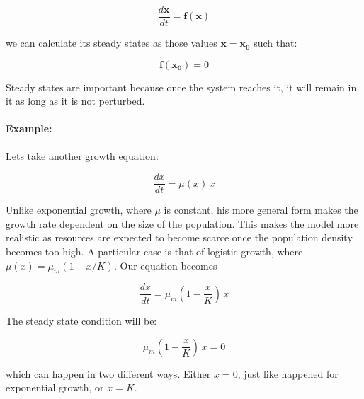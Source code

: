 \documentclass{tufte-book} %
\begin{document}
\begin{equation}
	\label{odegeneral}
	\frac{d\mathbf{x}}{dt} = \mathbf{f}(\mathbf{x})
\end{equation}

we can calculate its steady states as those values $\mathbf{x}= \mathbf{x_0}$ such that:

\begin{equation}
	\label{stst}
	\mathbf{f}(\mathbf{x_0}) = 0
\end{equation}

Steady states are important because once the system reaches it, it will remain in it as long as it is not perturbed.

\paragraph{Example:} Lets take another growth equation:

\begin{equation}
	\label{odgrowth}
	\frac{dx}{dt} = \mu(x) \, x 
\end{equation}

Unlike exponential growth, where $\mu$ is constant, his more general form makes the growth rate dependent on the size of the population. This makes the model more realistic as resources are expected to become scarce once the population density becomes too high. A particular case is that of logistic growth, where $\mu(x) = \mu_{m} (1 - x / K)$. Our equation becomes

\begin{equation}
	\label{logistic}
	\frac{dx}{dt} = \mu_{m} \left(1 - \frac{x}{K} \right) \, x 
\end{equation}

The steady state condition will be:

\begin{equation}
 \mu_{m} \left(1 - \frac{x}{K} \right) \, x = 0
\end{equation}

which can happen in two different ways. Either $x=0$, just like happened for exponential growth, or $x=K$.
\end{document}
